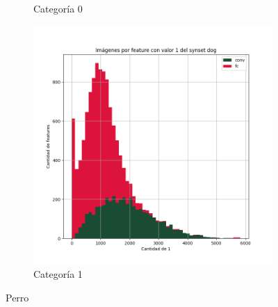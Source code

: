 \documentclass[12,twoside]{TFG-GM}
\theoremstyle{definition}
\theoremstyle{remark}
\begin{document}
\begin{figure}[ht]
\begin{subfigure}[b]{0.3\textwidth}
		\caption{Categoría 0}
	\end{subfigure}
	\begin{subfigure}[b]{0.3\textwidth}
		\includegraphics[width=\textwidth]  {Images/plots/25/synsets/Images_per_feature_of_1_category_dogall_layers.png}
		\caption{Categoría 1}
	\end{subfigure}       
	\caption{Perro}
\end{figure}
\end{document}
